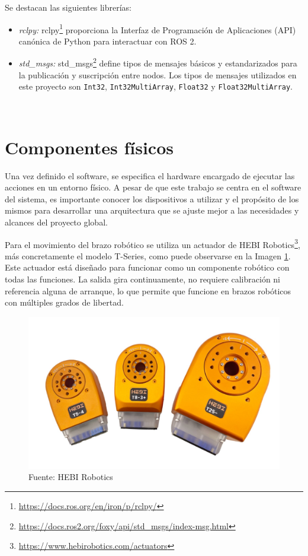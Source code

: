 Se destacan las siguientes librerías:

\begin{itemize}
    \item \textit{rclpy:} rclpy\footnote{\url{https://docs.ros.org/en/iron/p/rclpy/}} proporciona la Interfaz de Programación de Aplicaciones (API) canónica de Python para interactuar con ROS 2.
    \item \textit{std\_msgs:} std\_msgs\footnote{\url{https://docs.ros2.org/foxy/api/std_msgs/index-msg.html}} define tipos de mensajes básicos y estandarizados para la publicación y suscripción entre nodos. Los tipos de mensajes utilizados en este proyecto son \verb|Int32|, \verb|Int32MultiArray|, \verb|Float32| y \verb|Float32MultiArray|.
\end{itemize}\

\section{Componentes físicos}
\label{sec:entornos}

Una vez definido el software, se especifica el hardware encargado de ejecutar las acciones en un entorno físico.
A pesar de que este trabajo se centra en el software del sistema, es importante conocer los dispositivos a utilizar y el propósito de los mismos para desarrollar una arquitectura que se ajuste mejor a las necesidades y alcances del proyecto global.

Para el movimiento del brazo robótico se utiliza un actuador de HEBI Robotics\footnote{\url{https://www.hebirobotics.com/actuators}}, más concretamente el modelo T-Series, como puede observarse en la Imagen \ref{fig:actuador}.
Este actuador está diseñado para funcionar como un componente robótico con todas las funciones.
La salida gira continuamente, no requiere calibración ni referencia alguna de arranque, lo que permite que funcione en brazos robóticos con múltiples grados de libertad.

\begin{figure}[ht!]
	\centering
	\begin{minipage}{0.45\linewidth}
		\centering
		\includegraphics[width=\linewidth]{figs/actuador_T-Series.jpg}
	\end{minipage}
	\caption[Actuador T-Series]{Fuente: HEBI Robotics}
	\label{fig:actuador}
\end{figure}


